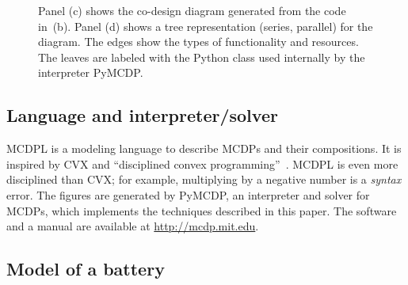 \begin{figure}
\begin{centering}
{}\medskip{}
\par\end{centering}
\begin{centering}
\par\end{centering}
\medskip{}

\medskip{}

\caption{Panel (c) shows the co-design diagram generated from the code in~(b).
Panel (d) shows a tree representation (series, parallel) for the diagram.
The edges show the types of functionality and resources. The leaves
are labeled with the Python class used internally by the interpreter
PyMCDP. }
\end{figure}


\subsection{Language and interpreter/solver}

MCDPL is a modeling language to describe MCDPs and their compositions.
It is inspired by CVX and ``disciplined convex programming''~\cite{grant08graph}.
MCDPL is even more disciplined than CVX; for example, multiplying
by a negative number is a \emph{syntax} error. The figures are generated
by PyMCDP, an interpreter and solver for MCDPs, which implements the
techniques described in this paper.  The software and a manual are
available at \url{http://mcdp.mit.edu}.

\subsection{Model of a battery}

